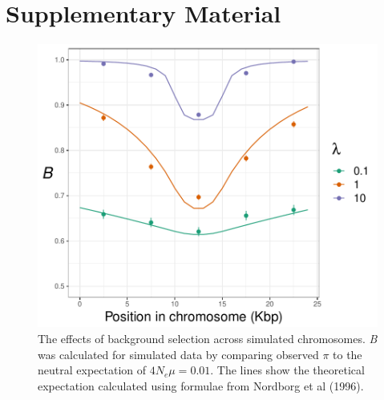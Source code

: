 \documentclass[11pt,twoside,lineno]{GSA_format}
\newcommand{\beginsupplement}{%
        \setcounter{table}{0}
        \renewcommand{\thetable}{S\arabic{table}}%
        \setcounter{figure}{0}
        \renewcommand{\thefigure}{S\arabic{figure}}%
     }
\begin{document}
\beginsupplement
\section{Supplementary Material}

\begin{figure}[h]
\includegraphics[width=\textwidth]{../TheoreticalExpectation/B_fixed_plot}
\caption{The effects of background selection across simulated chromosomes. \textit{B} was calculated for simulated data by comparing observed $\pi$ to the neutral expectation of $4N_e\mu=0.01$. The lines show the theoretical expectation calculated using formulae from Nordborg et al (1996).}
\label{fig:BGS_fixed_plot}
\end{figure}
\end{document}
